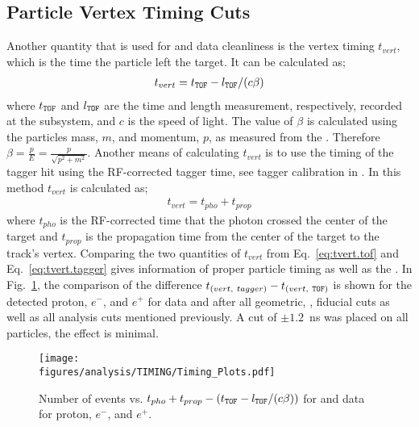 \subsection{Particle Vertex Timing Cuts}\label{sec:analysis.timing}
Another quantity that is used for  and data cleanliness is the vertex timing $t_{vert}$, which is the time the particle left the target. It can be calculated as;
\begin{align}
t_{vert}= t_{\textsc{\texttt{TOF}}} -  l_{\textsc{\texttt{TOF}}}/(c\beta) \label{eq:tvert.tof}
\end{align}
where $t_{\textsc{\texttt{TOF}}}$ and $l_{\textsc{\texttt{TOF}}}$ are the time and length measurement, respectively, recorded at the  subsystem, and $c$ is the speed of light. The value of $\beta$ is calculated using the particles mass, $m$, and momentum, $p$, as measured from the . Therefore $\beta = \frac{p}{E} = \frac{p}{\sqrt{p^2+m^2}}$. Another means of calculating $t_{vert}$ is to use the timing of the tagger hit using the RF-corrected tagger time, see tagger calibration in \cite{clas.g12.note}. In this method $t_{vert}$ is calculated as;
\begin{align}
t_{vert}=t_{pho} + t_{prop} \label{eq:tvert.tagger}
\end{align}
where $t_{pho}$ is the RF-corrected time that the photon crossed the center of the target and $t_{prop}$ is the propagation time from the center of the target to the track's vertex. Comparing the two quantities of $t_{vert}$ from Eq.~\ref{eq:tvert.tof} and Eq.~\ref{eq:tvert.tagger} gives information of proper particle timing as well as the . In Fig.~\ref{fig:timing.all}, the comparison of the difference $t_{(vert, \ tagger)} - t_{(vert,\ \abbr{TOF})}$ is shown for the detected proton, $e^-$, and $e^+$ for data and  after all geometric, ,  fiducial cuts as well as all analysis cuts mentioned previously. A cut of $\pm 1.2$~ns was placed on all particles, the effect is minimal.


\begin{figure}[h!]\begin{center}
\texttt{[image: \\figures/analysis/TIMING/Timing\_Plots.pdf]}
\caption[Number of events vs. $t_{pho} + t_{prop} - (t_{\abbr{TOF}} -  l_{\abbr{TOF}}/(c\beta))$ for  and data for proton, $e^-$, and $e^+$]{\label{fig:timing.all}Number of events vs. $t_{pho} + t_{prop} - (t_{\abbr{TOF}} -  l_{\abbr{TOF}}/(c\beta))$ for  and data for proton, $e^-$, and $e^+$.}
\end{center}\end{figure}


